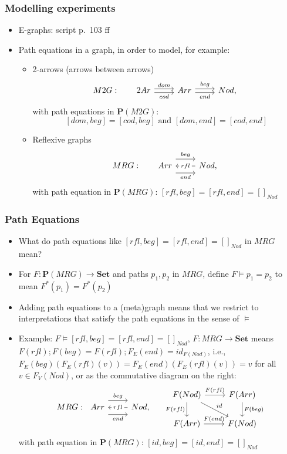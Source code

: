 \documentclass[handout]{beamer}
\newcommand{\bfsf}[1]{{\boldsymbol{#1}}}
\newcommand{\Set}{\bfsf{Set}}
\newcommand{\PP}{\bfsf{P}}
\begin{document}
\frame
  {   
    \frametitle{Modelling experiments}\label{Ch3:Modelling}

 \begin{itemize}[<+->]
\item E-graphs: script p.\ 103 ff
\item Path equations in a graph, in order to model, for example:
   \begin{itemize}[<+->]
\item 2-arrows (arrows between arrows)
\[M2G:~~~~~ 
\begin{tikzcd}[ampersand replacement=\&]
2Ar \arrow[yshift=0.5ex]{r}{dom} \arrow[swap, yshift=-0.5ex]{r}{cod} \& Arr \arrow[yshift=0.5ex]{r}{beg} \arrow[swap, yshift=-0.5ex]{r}{end} \& Nod,
\end{tikzcd}\]
with path equations in $\PP(M2G)$:
\[
[dom,beg]=[cod,beg] \text{~and~} [dom,end]=[cod,end]
\] 
\item Reflexive graphs
 \[MRG:~~~~~
\begin{tikzcd}[ampersand replacement=\&]
Arr \arrow[yshift=2ex]{r}{beg} \arrow[swap, yshift=-2ex]{r}{end}  \& \arrow{l}[description]{rfl} Nod,
\end{tikzcd}\] 
with path equation in $\PP(MRG)$: $[rfl,beg]=[rfl,end]=[]_{Nod}$ 
   \end{itemize}

 \end{itemize}

 }

\frame
  {   
    \frametitle{Path Equations}\label{Ch3:PathEqs}

 \begin{itemize}[<+->]
\item What do path equations like $[rfl,beg]=[rfl,end]=[]_{Nod}$ in $MRG$ mean?
\item For $F : \PP(MRG)\to\Set$ and paths $p_1,p_2$ in $MRG$, define $F\models p_1=p_2$
to mean $F^*(p_1) = F^*(p_2)$
\item Adding path equations to a (meta)graph means that we restrict to interpretations
that satisfy the path equations in the sense of $\models$
\item Example: $F\models [rfl,beg]=[rfl,end]=[]_{Nod}$, $F: MRG\to\Set$
means $F(rfl);F(beg)=F(rfl);F_E(end)=id_{F(Nod)}$, i.e., 
$F_E(beg)(F_E(rfl)(v)) = F_E(end)(F_E(rfl)(v)) = v$ for all $v\in F_V(Nod)$,
or as the commutative diagram on the right:
 \[
\begin{tikzcd}[ampersand replacement=\&]
MRG: ~ ~Arr \arrow[yshift=2ex]{r}{beg} \arrow[swap, yshift=-2ex]{r}{end}  \& \arrow{l}[description]{rfl} Nod,
\end{tikzcd}
~~ ~ ~ \begin{tikzcd}[ampersand replacement=\&]
F(Nod) \arrow{r}{F(rfl)}\arrow[swap]{d}{F(rfl)}\arrow{rd}{id}\& F(Arr) \arrow{d}{F(beg)} \\
F(Arr) \arrow{r}{F(end)} \& F(Nod)
\end{tikzcd}
\]
with path equation in $\PP(MRG)$: $[id,beg]=[id,end]=[]_{Nod}$ 

 \end{itemize}

 }
\end{document}
